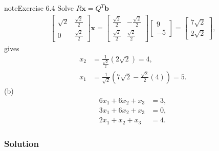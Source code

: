 \documentclass[letterpaper,10pt,english]{jupyterBook}
\begin{document}
\begin{sphinxadmonition}{note}{Exercise 6.4}
Solve \(R \mathbf{{x}} = Q^T \mathbf{{b}}\)
\begin{align*}
    \left[\begin{matrix}\sqrt{2} & \frac{\sqrt{2}}{2}\\0 & \frac{\sqrt{2}}{2}\end{matrix}\right] \mathbf{x} = \left[\begin{matrix}\frac{\sqrt{2}}{2} & - \frac{\sqrt{2}}{2}\\\frac{\sqrt{2}}{2} & \frac{\sqrt{2}}{2}\end{matrix}\right]\left[\begin{matrix}9\\-5\end{matrix}\right] = \left[\begin{matrix}7 \sqrt{2}\\2 \sqrt{2}\end{matrix}\right],
\end{align*}
\sphinxAtStartPar
gives
\begin{align*}
    x_{2} &= \frac{1}{\frac{\sqrt{2}}{2}} (2 \sqrt{2}) = 4, \\
    x_{1} &= \frac{1}{\sqrt{2}} (7 \sqrt{2} - \frac{\sqrt{2}}{2}(4)) = 5.
\end{align*}
\sphinxAtStartPar
(b)
\begin{align*}
    6x_1 +6x_2 +x_3 &=3,\\
    3x_1 +6x_2 +x_3 &=0,\\
    2x_1 +x_2 +x_3 &=4.
\end{align*}\subsubsection*{Solution}


\end{sphinxadmonition}
\end{document}
